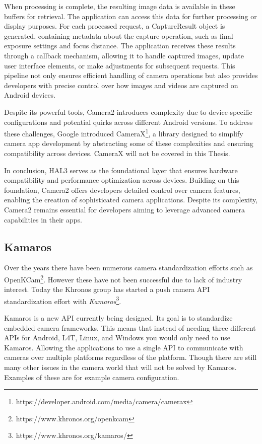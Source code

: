When processing is complete, the resulting image data is available in these
buffers for retrieval. The application can access this data for further
processing or display purposes. For each processed request, a CaptureResult
object is generated, containing metadata about the capture operation, such as
final exposure settings and focus distance. The application receives these
results through a callback mechanism, allowing it to handle captured images,
update user interface elements, or make adjustments for subsequent requests.
This pipeline not only ensures efficient handling of camera operations but also
provides developers with precise control over how images and videos are
captured on Android devices.


Despite its powerful tools, Camera2 introduces complexity due to
device-specific configurations and potential quirks across different Android
versions. To address these challenges, Google introduced CameraX\footnote{https://developer.android.com/media/camera/camerax},
a library designed to simplify camera app development by abstracting some of
these complexities and ensuring compatibility across devices. CameraX will not
be covered in this Thesis.

In conclusion, HAL3 serves as the foundational layer that ensures hardware
compatibility and performance optimization across devices. Building on this
foundation, Camera2 offers developers detailed control over camera features,
enabling the creation of sophisticated camera applications. Despite its
complexity, Camera2 remains essential for developers aiming to leverage
advanced camera capabilities in their apps.


\subsection{Kamaros}
Over the years there have been numerous camera standardization efforts such as
OpenKCam\footnote{https://www.khronos.org/openkcam}. However these have not been
successful due to lack of industry interest. Today the Khronos group has
started a push camera API standardization effort with \textit{Kamaros}\footnote{https://www.khronos.org/kamaros/}.

Kamaros is a new API currently being designed. Its goal is to
standardize embedded camera frameworks. This means that instead of needing
three different APIs for Android, L4T, Linux, and Windows you would only need to
use Kamaros. Allowing the applications to use a single API to communicate with
cameras over multiple platforms regardless of the platform. Though there are
still many other issues in the camera world that will not be solved by Kamaros.
Examples of these are for example camera configuration.

